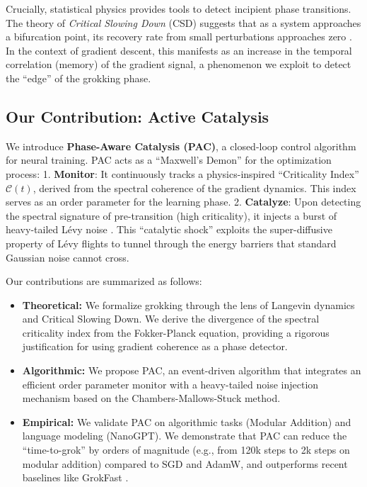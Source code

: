 \documentclass{article}
\theoremstyle{plain}
\theoremstyle{definition}
\theoremstyle{remark}
\newcommand{\C}{\mathcal{C}} %
\begin{document}
Crucially, statistical physics provides tools to detect incipient phase transitions. The theory of \textit{Critical Slowing Down} (CSD) suggests that as a system approaches a bifurcation point, its recovery rate from small perturbations approaches zero \cite{scheffer2009early}. In the context of gradient descent, this manifests as an increase in the temporal correlation (memory) of the gradient signal, a phenomenon we exploit to detect the ``edge'' of the grokking phase.

\subsection{Our Contribution: Active Catalysis}
We introduce \textbf{Phase-Aware Catalysis (PAC)}, a closed-loop control algorithm for neural training. PAC acts as a ``Maxwell's Demon'' for the optimization process:
1.  \textbf{Monitor}: It continuously tracks a physics-inspired ``Criticality Index'' $\C(t)$, derived from the spectral coherence of the gradient dynamics. This index serves as an order parameter for the learning phase.
2.  \textbf{Catalyze}: Upon detecting the spectral signature of pre-transition (high criticality), it injects a burst of heavy-tailed Lévy noise \cite{simsekli2019tail}. This ``catalytic shock'' exploits the super-diffusive property of Lévy flights to tunnel through the energy barriers that standard Gaussian noise cannot cross.

Our contributions are summarized as follows:
\begin{itemize}
    \item \textbf{Theoretical:} We formalize grokking through the lens of Langevin dynamics and Critical Slowing Down. We derive the divergence of the spectral criticality index from the Fokker-Planck equation, providing a rigorous justification for using gradient coherence as a phase detector.
    \item \textbf{Algorithmic:} We propose PAC, an event-driven algorithm that integrates an efficient order parameter monitor with a heavy-tailed noise injection mechanism based on the Chambers-Mallows-Stuck method.
    \item \textbf{Empirical:} We validate PAC on algorithmic tasks (Modular Addition) and language modeling (NanoGPT). We demonstrate that PAC can reduce the ``time-to-grok'' by orders of magnitude (e.g., from 120k steps to 2k steps on modular addition) compared to SGD and AdamW, and outperforms recent baselines like GrokFast \cite{merrill2024grokfast}.
\end{itemize}
\end{document}
